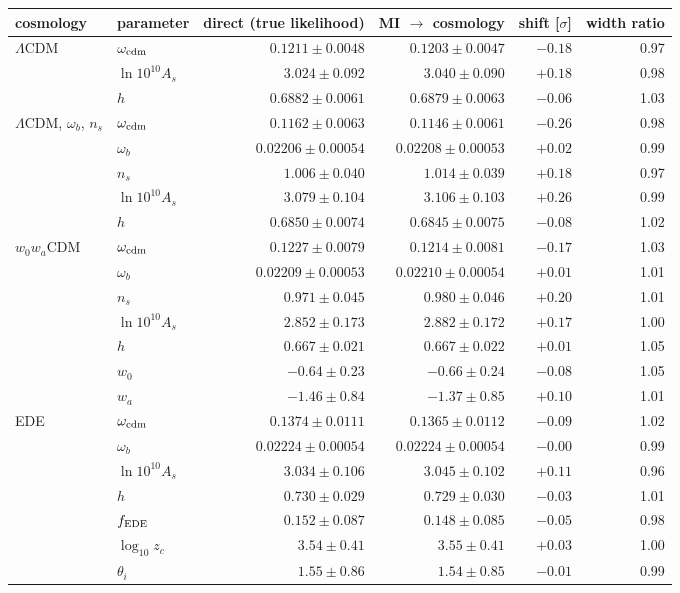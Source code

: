 \documentclass[11pt]{article}
\begin{document}
\small
\begin{center}
\begin{tabular}{@{}llrrrr@{}}
\toprule
cosmology & parameter & direct (true likelihood) & MI $\to$ cosmology & shift [$\sigma$] & width ratio \\
\midrule
$\Lambda$CDM & $\omega_{\rm cdm}$ & $0.1211\pm0.0048$ & $0.1203\pm0.0047$ & $-0.18$ & 0.97 \\
 & $\ln10^{10}A_s$ & $3.024\pm0.092$ & $3.040\pm0.090$ & $+0.18$ & 0.98 \\
 & $h$ & $0.6882\pm0.0061$ & $0.6879\pm0.0063$ & $-0.06$ & 1.03 \\
\midrule
$\Lambda$CDM, $\omega_b$, $n_s$ & $\omega_{\rm cdm}$ & $0.1162\pm0.0063$ & $0.1146\pm0.0061$ & $-0.26$ & 0.98 \\
 & $\omega_b$ & $0.02206\pm0.00054$ & $0.02208\pm0.00053$ & $+0.02$ & 0.99 \\
 & $n_s$ & $1.006\pm0.040$ & $1.014\pm0.039$ & $+0.18$ & 0.97 \\
 & $\ln10^{10}A_s$ & $3.079\pm0.104$ & $3.106\pm0.103$ & $+0.26$ & 0.99 \\
 & $h$ & $0.6850\pm0.0074$ & $0.6845\pm0.0075$ & $-0.08$ & 1.02 \\
\midrule
$w_0w_a$CDM & $\omega_{\rm cdm}$ & $0.1227\pm0.0079$ & $0.1214\pm0.0081$ & $-0.17$ & 1.03 \\
 & $\omega_b$ & $0.02209\pm0.00053$ & $0.02210\pm0.00054$ & $+0.01$ & 1.01 \\
 & $n_s$ & $0.971\pm0.045$ & $0.980\pm0.046$ & $+0.20$ & 1.01 \\
 & $\ln10^{10}A_s$ & $2.852\pm0.173$ & $2.882\pm0.172$ & $+0.17$ & 1.00 \\
 & $h$ & $0.667\pm0.021$ & $0.667\pm0.022$ & $+0.01$ & 1.05 \\
 & $w_0$ & $-0.64\pm0.23$ & $-0.66\pm0.24$ & $-0.08$ & 1.05 \\
 & $w_a$ & $-1.46\pm0.84$ & $-1.37\pm0.85$ & $+0.10$ & 1.01 \\
\midrule
EDE & $\omega_{\rm cdm}$ & $0.1374\pm0.0111$ & $0.1365\pm0.0112$ & $-0.09$ & 1.02 \\
 & $\omega_b$ & $0.02224\pm0.00054$ & $0.02224\pm0.00054$ & $-0.00$ & 0.99 \\
 & $\ln10^{10}A_s$ & $3.034\pm0.106$ & $3.045\pm0.102$ & $+0.11$ & 0.96 \\
 & $h$ & $0.730\pm0.029$ & $0.729\pm0.030$ & $-0.03$ & 1.01 \\
 & $f_{\rm EDE}$ & $0.152\pm0.087$ & $0.148\pm0.085$ & $-0.05$ & 0.98 \\
 & $\log_{10}z_c$ & $3.54\pm0.41$ & $3.55\pm0.41$ & $+0.03$ & 1.00 \\
 & $\theta_i$ & $1.55\pm0.86$ & $1.54\pm0.85$ & $-0.01$ & 0.99 \\
\bottomrule
\end{tabular}
\end{center}
\normalsize
\end{document}
